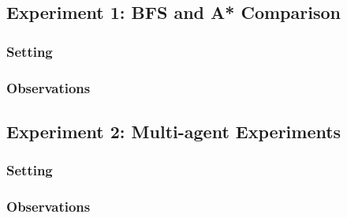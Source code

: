 \documentclass[11pt]{article}
\begin{document}
\subsection{Experiment 1: BFS and A* Comparison}

\subsubsection{Setting}

\subsubsection{Observations}


\subsection{Experiment 2: Multi-agent Experiments}

\subsubsection{Setting}

\subsubsection{Observations}
\end{document}
